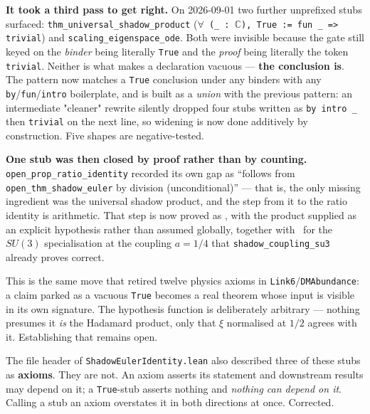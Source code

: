 \documentclass{report}
\theoremstyle{definition}
\begin{document}
\begin{itemize}
\begin{itemize}
\medskip
\noindent\textbf{It took a third pass to get right.} On 2026-09-01 two further unprefixed
stubs surfaced: \texttt{thm\_universal\_shadow\_product}
(\texttt{$\forall$ (\_ : $\mathbb{C}$), True := fun \_ => trivial}) and
\texttt{scaling\_eigenspace\_ode}. Both were invisible because the gate still keyed on the
\emph{binder} being literally \texttt{True} and the \emph{proof} being literally the token
\texttt{trivial}. Neither is what makes a declaration vacuous --- \textbf{the conclusion is}.
The pattern now matches a \texttt{True} conclusion under any binders with any
\texttt{by}/\texttt{fun}/\texttt{intro} boilerplate, and is built as a \emph{union} with the
previous pattern: an intermediate "cleaner" rewrite silently dropped four stubs written as
\texttt{by intro \_} then \texttt{trivial} on the next line, so widening is now done additively
by construction. Five shapes are negative-tested.

\medskip
\noindent\textbf{One stub was then closed by proof rather than by counting.}
\texttt{open\_prop\_ratio\_identity} recorded its own gap as ``follows from
\texttt{open\_thm\_shadow\_euler} by division (unconditional)'' --- that is, the only missing
ingredient was the universal shadow product, and the step from it to the ratio identity is
arithmetic. That step is now proved as
\leanok, with the product supplied as
an explicit hypothesis rather than assumed globally, together with
\leanok\ for the $SU(3)$ specialisation at
the coupling $a = 1/4$ that \texttt{shadow\_coupling\_su3} already proves correct.

This is the same move that retired twelve physics axioms in \texttt{Link6}/\texttt{DMAbundance}:
a claim parked as a vacuous \texttt{True} becomes a real theorem whose input is visible in its
own signature. The hypothesis function is deliberately arbitrary --- nothing presumes it
\emph{is} the Hadamard product, only that $\xi$ normalised at $1/2$ agrees with it.
Establishing that remains open.

\medskip
\noindent The file header of \texttt{ShadowEulerIdentity.lean} also described three of these
stubs as \textbf{axioms}. They are not. An axiom asserts its statement and downstream results
may depend on it; a \texttt{True}-stub asserts nothing and \emph{nothing can depend on it}.
Calling a stub an axiom overstates it in both directions at once. Corrected.


\end{itemize}
\end{itemize}
\end{document}
